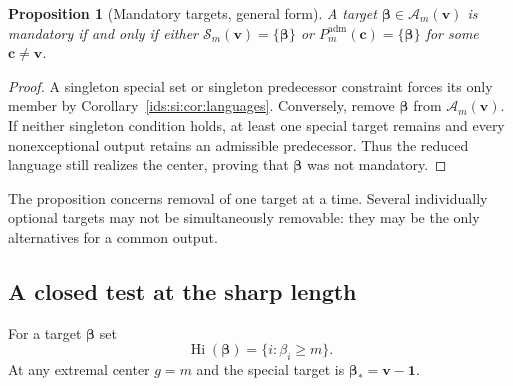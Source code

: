 \documentclass[11pt,letterpaper]{article}
\newtheorem{proposition}[theorem]{Proposition}
\theoremstyle{definition}\newtheorem{definition}[theorem]{Definition}
\theoremstyle{remark}\newtheorem{remark}[theorem]{Remark}
\theoremstyle{definition}\newtheorem{question}[theorem]{Question}
\newcommand{\Adm}[1]{\mathcal A_m(#1)}
\newcommand{\bpSpecial}[1]{\mathcal S_m(#1)}
\begin{document}
\begin{proposition}[Mandatory targets, general form]\label{ids:si:prop:mandatorygeneral}
A target $\boldsymbol\beta\in\Adm{\mathbf v}$ is mandatory if and only if either
$\bpSpecial{\mathbf v}=\{\boldsymbol\beta\}$ or $P^{\mathrm{adm}}_m(\mathbf c)=\{\boldsymbol\beta\}$ for some $\mathbf c\ne\mathbf v$.
\end{proposition}
\begin{proof}
A singleton special set or singleton predecessor constraint forces its
only member by Corollary~\ref{ids:si:cor:languages}. Conversely, remove $\boldsymbol\beta$ from
$\Adm{\mathbf v}$. If neither singleton condition holds, at least one special
target remains and every nonexceptional output retains an admissible
predecessor. Thus the reduced language still realizes the center, proving
that $\boldsymbol\beta$ was not mandatory.
\end{proof}
The proposition concerns removal of one target at a time. Several individually
optional targets may not be simultaneously removable: they may be the
only alternatives for a common output.

\subsection{A closed test at the sharp length}
For a target $\boldsymbol\beta$ set
\[
 \operatorname{Hi}(\boldsymbol\beta)=\{i:\beta_i\geq m\}.
\]
At any extremal center $g=m$ and the special target is
$\boldsymbol\beta_*=\mathbf v-\mathbf 1$.
\end{document}
